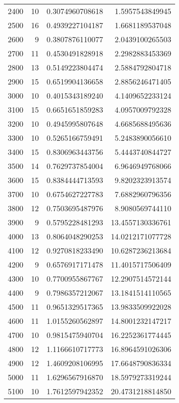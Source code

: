 \begin{longtable}{lrrr}
2400 & 10 & 0.3074960708618 & 1.5957543849945 \\
2500 & 16 & 0.4939227104187 & 1.6681189537048 \\
2600 & 9 & 0.3807876110077 & 2.0439100265503 \\
2700 & 11 & 0.4530491828918 & 2.2982883453369 \\
2800 & 13 & 0.5149223804474 & 2.5884792804718 \\
2900 & 15 & 0.6519904136658 & 2.8856246471405 \\
3000 & 10 & 0.4015343189240 & 4.1409652233124 \\
3100 & 15 & 0.6651651859283 & 4.0957009792328 \\
3200 & 10 & 0.4945995807648 & 4.6685688495636 \\
3300 & 10 & 0.5265166759491 & 5.2483890056610 \\
3400 & 15 & 0.8306963443756 & 5.4443740844727 \\
3500 & 14 & 0.7629737854004 & 6.9646949768066 \\
3600 & 15 & 0.8384444713593 & 9.8202323913574 \\
3700 & 10 & 0.6754627227783 & 7.6882960796356 \\
3800 & 12 & 0.7503695487976 & 8.9080569744110 \\
3900 & 9 & 0.5795228481293 & 13.4557130336761 \\
4000 & 13 & 0.8064048290253 & 14.0212171077728 \\
4100 & 12 & 0.9270818233490 & 10.6287236213684 \\
4200 & 9 & 0.6576917171478 & 11.4015717506409 \\
4300 & 10 & 0.7700955867767 & 12.2907514572144 \\
4400 & 9 & 0.7986357212067 & 13.1841514110565 \\
4500 & 11 & 0.9651329517365 & 13.9833509922028 \\
4600 & 11 & 1.0155260562897 & 14.8001232147217 \\
4700 & 10 & 0.9815475940704 & 16.2252361774445 \\
4800 & 12 & 1.1166610717773 & 16.8964591026306 \\
4900 & 12 & 1.4609208106995 & 17.6648790836334 \\
5000 & 11 & 1.6296567916870 & 18.5979273319244 \\
5100 & 10 & 1.7612597942352 & 20.4731218814850 \\
\end{longtable}
